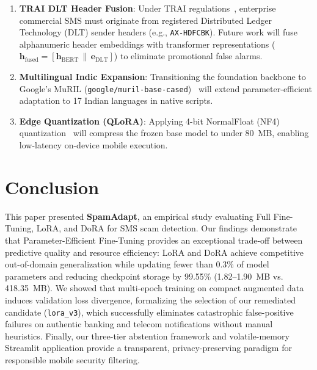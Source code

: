 \documentclass[conference]{IEEEtran}
\begin{document}
\begin{enumerate}
    \item \textbf{TRAI DLT Header Fusion}: Under TRAI regulations~\cite{trai2018tcccpr}, enterprise commercial SMS must originate from registered Distributed Ledger Technology (DLT) sender headers (e.g., \texttt{AX-HDFCBK}). Future work will fuse alphanumeric header embeddings with transformer representations ($\mathbf{h}_{\text{fused}} = [\mathbf{h}_{\text{BERT}} \,\|\, \mathbf{e}_{\text{DLT}}]$) to eliminate promotional false alarms.
    \item \textbf{Multilingual Indic Expansion}: Transitioning the foundation backbone to Google's MuRIL (\texttt{google/muril-base-cased})~\cite{khanuja2021muril} will extend parameter-efficient adaptation to 17 Indian languages in native scripts.
    \item \textbf{Edge Quantization (QLoRA)}: Applying 4-bit NormalFloat (NF4) quantization~\cite{dettmers2024qlora} will compress the frozen base model to under 80~MB, enabling low-latency on-device mobile execution.
\end{enumerate}

\section{Conclusion}
\label{sec:conclusion}

This paper presented \textbf{SpamAdapt}, an empirical study evaluating Full Fine-Tuning, LoRA, and DoRA for SMS scam detection. Our findings demonstrate that Parameter-Efficient Fine-Tuning provides an exceptional trade-off between predictive quality and resource efficiency: LoRA and DoRA achieve competitive out-of-domain generalization while updating fewer than 0.3\% of model parameters and reducing checkpoint storage by 99.55\% (1.82--1.90~MB vs. 418.35~MB). We showed that multi-epoch training on compact augmented data induces validation loss divergence, formalizing the selection of our remediated candidate (\texttt{lora\_v3}), which successfully eliminates catastrophic false-positive failures on authentic banking and telecom notifications without manual heuristics. Finally, our three-tier abstention framework and volatile-memory Streamlit application provide a transparent, privacy-preserving paradigm for responsible mobile security filtering.
\end{document}
